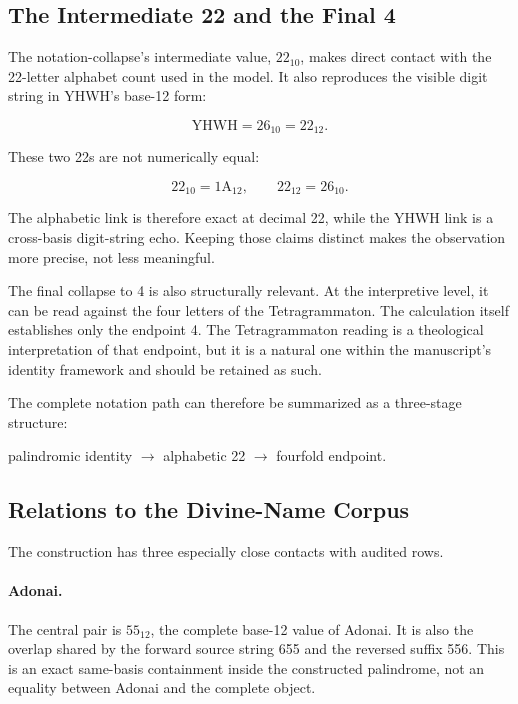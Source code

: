 \subsection{The Intermediate 22 and the Final 4}

The notation-collapse's intermediate value, $22_{10}$, makes direct contact with the 22-letter alphabet count used in the model. It also reproduces the visible digit string in YHWH's base-12 form:

\[
\text{YHWH}=26_{10}=22_{12}.
\]

These two 22s are not numerically equal:

\[
22_{10}=1\mathrm{A}_{12},
\qquad
22_{12}=26_{10}.
\]

The alphabetic link is therefore exact at decimal 22, while the YHWH link is a cross-basis digit-string echo. Keeping those claims distinct makes the observation more precise, not less meaningful.

The final collapse to 4 is also structurally relevant. At the interpretive level, it can be read against the four letters of the Tetragrammaton. The calculation itself establishes only the endpoint 4. The Tetragrammaton reading is a theological interpretation of that endpoint, but it is a natural one within the manuscript's identity framework and should be retained as such.

The complete notation path can therefore be summarized as a three-stage structure:

\begin{center}
palindromic identity $\longrightarrow$ alphabetic 22 $\longrightarrow$ fourfold endpoint.
\end{center}

\subsection{Relations to the Divine-Name Corpus}

The construction has three especially close contacts with audited rows.

\paragraph{Adonai.}
The central pair is $55_{12}$, the complete base-12 value of Adonai. It is also the overlap shared by the forward source string 655 and the reversed suffix 556. This is an exact same-basis containment inside the constructed palindrome, not an equality between Adonai and the complete object.

